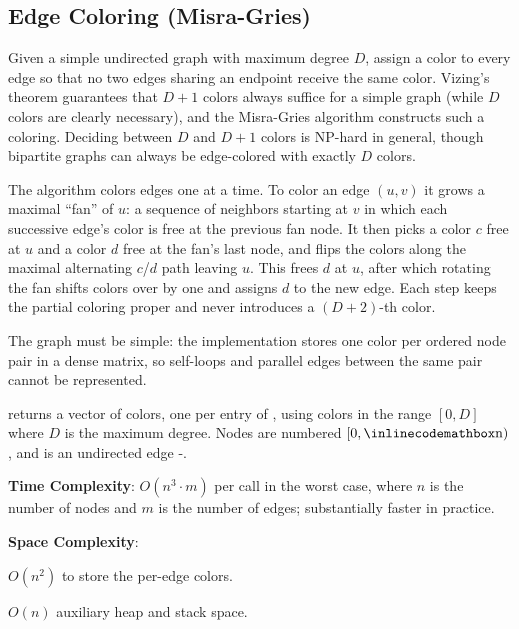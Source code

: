 \subsection{Edge Coloring (Misra-Gries)}
\label{sec:4.7.3}
Given a simple undirected graph with maximum degree $D$, assign a color to every edge so that no two edges sharing an endpoint receive the same color. Vizing's theorem guarantees that $D + 1$ colors always suffice for a simple graph (while $D$ colors are clearly necessary), and the Misra-Gries algorithm constructs such a coloring. Deciding between $D$ and $D + 1$ colors is NP-hard in general, though bipartite graphs can always be edge-colored with exactly $D$ colors.

The algorithm colors edges one at a time. To color an edge $(u, v)$ it grows a maximal ``fan'' of $u$: a sequence of neighbors starting at $v$ in which each successive edge's color is free at the previous fan node. It then picks a color $c$ free at $u$ and a color $d$ free at the fan's last node, and flips the colors along the maximal alternating $c$/$d$ path leaving $u$. This frees $d$ at $u$, after which rotating the fan shifts colors over by one and assigns $d$ to the new edge. Each step keeps the partial coloring proper and never introduces a $(D + 2)$-th color.

The graph must be simple: the implementation stores one color per ordered node pair in a dense matrix, so self-loops and parallel edges between the same pair cannot be represented.

\begin{compactitem}
  \item {} returns a vector of colors, one per entry of , using colors in the range $[0, D]$ where $D$ is the maximum degree. Nodes are numbered $[0, {\inlinecodemath{n}})$, and  is an undirected edge -.
\end{compactitem}

\textbf{Time Complexity}: $O(n^{3} \cdot m)$ per call in the worst case, where $n$ is the number of nodes and $m$ is the number of edges; substantially faster in practice.

\textbf{Space Complexity}:
\begin{compactitem}
  \item $O(n^{2})$ to store the per-edge colors.
  \item $O(n)$ auxiliary heap and stack space.
\end{compactitem}

